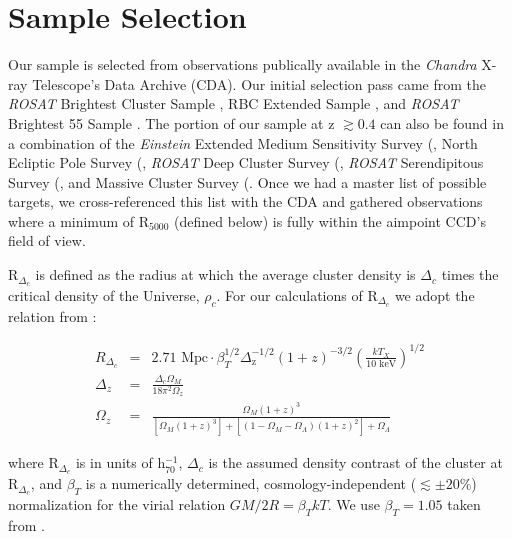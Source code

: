 \documentclass{emulateapj}
\begin{document}
\section{Sample Selection} \label{sec:selection}


Our sample is selected from observations publically available in the
{\textit{Chandra}} X-ray
Telescope's Data Archive (CDA). Our initial selection pass came from the
{\textit{ROSAT}} Brightest Cluster Sample
\citep{1998MNRAS.301..881E}, RBC Extended Sample 
\citep{2000MNRAS.318..333E}, and {\textit{ROSAT}} Brightest 55 Sample
\citep{1990MNRAS.245..559E, 1998MNRAS.298..416P}. The
portion of our sample at z $\gtrsim 0.4$ can also be found in a
combination of the {\textit{Einstein}} Extended Medium Sensitivity Survey
(\citep{1990ApJS...72..567G}, North Ecliptic Pole Survey
(\citep{2006ApJS..162..304H}, {\textit{ROSAT}} Deep Cluster Survey
(\citep{1995ApJ...445L..11R}, {\textit{ROSAT}} Serendipitous Survey
(\citep{1998ApJ...502..558V}, and Massive Cluster Survey
(\citep{2001ApJ...553..668E}. Once we had a master list of possible
targets, we cross-referenced this list with the CDA and gathered
observations where a minimum of R$_{5000}$ (defined below) is fully
within the aimpoint CCD's field of view.

R$_{\Delta_c}$ is defined as the radius at which the
average cluster density is $\Delta_c$ times the critical density of the
Universe, $\rho_c$. For our calculations of R$_{\Delta_c}$ we adopt the
relation from \cite{2002A&A...389....1A}:

\begin{eqnarray}
R_{\Delta_c} &=& 2.71 \text{ Mpc}
\cdot \beta_T^{1/2}
\Delta_{\text{z}}^{-1/2}
(1+z)^{-3/2}
(\frac{kT_X}{10 \text{ keV}})^{1/2}\\
\Delta_z &=& \frac{\Delta_c \Omega_M}{18\pi^2\Omega_z} \nonumber \\
\Omega_z &=& \frac{\Omega_M (1+z)^3}{[\Omega_M
(1+z)^3]+[(1-\Omega_M-\Omega_{\Lambda})(1+z)^2]+\Omega_{\Lambda}} \nonumber
\end{eqnarray}

where R$_{\Delta_c}$ is in units of h$_{70}^{-1}$, $\Delta_c$ is
the assumed density contrast of the cluster at R$_{\Delta_c}$, and
$\beta_T$ is a numerically determined, cosmology-independent
($\lesssim \pm 20\%$) normalization for the virial relation $GM/2R =
\beta_TkT$. We use $\beta_T = 1.05$ taken from
\cite{1996ApJ...469..494E}.
\end{document}
